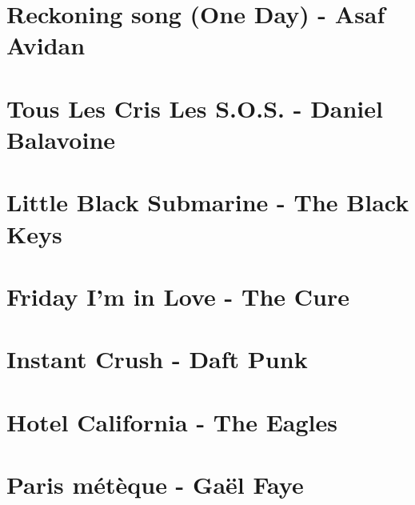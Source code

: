 \documentclass{guitartabs}
\begin{document}
\linespread{0.3}
\tableofcontents
\newpage

\linespread{1}


\section{Reckoning song (One Day) - Asaf Avidan}
\begin{guitar}

\end{guitar}


\section{Tous Les Cris Les S.O.S. - Daniel Balavoine}
\begin{guitar}

\end{guitar}


\section{Little Black Submarine - The Black Keys}
\begin{guitar}

\end{guitar}


\section{Friday I'm in Love - The Cure}
\begin{guitar}

\end{guitar}



\section{Instant Crush - Daft Punk}
\begin{guitar}

\end{guitar}




\section{Hotel California - The Eagles}
\begin{guitar}

\end{guitar}


\section{Paris métèque - Gaël Faye}
\begin{guitar}

\end{guitar}
\end{document}
